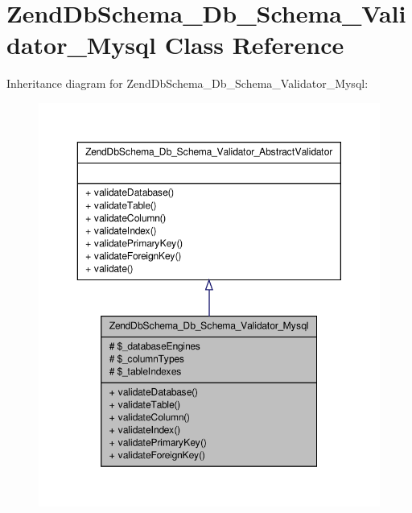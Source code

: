 \hypertarget{classZendDbSchema__Db__Schema__Validator__Mysql}{\section{\-Zend\-Db\-Schema\-\_\-\-Db\-\_\-\-Schema\-\_\-\-Validator\-\_\-\-Mysql \-Class \-Reference}
\label{classZendDbSchema__Db__Schema__Validator__Mysql}
}


\-Inheritance diagram for \-Zend\-Db\-Schema\-\_\-\-Db\-\_\-\-Schema\-\_\-\-Validator\-\_\-\-Mysql\-:\nopagebreak
\begin{figure}[H]
\begin{center}
\leavevmode
\includegraphics[width=350pt]{classZendDbSchema__Db__Schema__Validator__Mysql__inherit__graph}
\end{center}
\end{figure}


